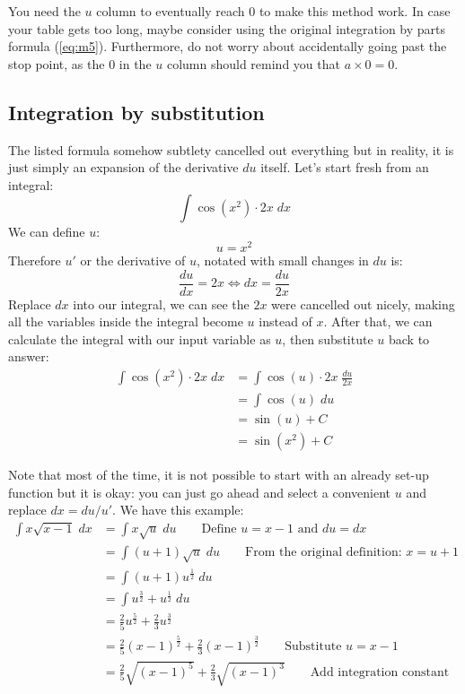 You need the $u$ column to eventually reach $0$ to make this method work. In case your table gets too long, maybe consider using the original integration by parts formula (\ref{eq:m5}). Furthermore, do not worry about accidentally going past the stop point, as the $0$ in the $u$ column should remind you that $a\times0=0$.

\subsection{Integration by substitution}
The listed formula somehow subtlety cancelled out everything but in reality, it is just simply an expansion of the derivative $du$ itself. Let's start fresh from an integral:
\[
    \int \cos(x^2) \cdot 2x \;dx
\]
We can define $u$:
\[
    u = x^2
\]
Therefore $u'$ or the derivative of $u$, notated with small changes in $du$ is:
\[
    \frac{du}{dx} = 2x
    \Leftrightarrow
    dx=\frac{du}{2x}
\]
Replace $dx$ into our integral, we can see the $2x$ were cancelled out nicely, making all the variables inside the integral become $u$ instead of $x$. After that, we can calculate the integral with our input variable as $u$, then substitute $u$ back to answer:
\[\begin{aligned}
    \int \cos(x^2) \cdot 2x \;dx
    &= \int \cos(u) \cdot 2x \;\frac{du}{2x} \\
    &= \int \cos(u) \;du \\
    &= \sin(u) + C \\
    &= \sin(x^2) + C
\end{aligned}\]

Note that most of the time, it is not possible to start with an already set-up function but it is okay: you can just go ahead and select a convenient $u$ and replace $dx=du/u'$. We have this example:
\[\begin{aligned}
    \int x\sqrt{x-1} \;dx
    &= \int x\sqrt{u} \;du
    \qquad\text{Define } u=x-1 \text{ and } du=dx \\
    &= \int (u+1)\sqrt{u} \;du
    \qquad\text{From the original definition: } x=u+1 \\
    &= \int (u+1)u^{\frac{1}{2}} \;du \\
    &= \int u^{\frac{3}{2}} + u^{\frac{1}{2}} \;du \\
    &= \frac{2}{5}u^{\frac{5}{2}} + \frac{2}{3}u^{\frac{3}{2}} \\
    &= \frac{2}{5}(x-1)^{\frac{5}{2}} + \frac{2}{3}(x-1)^{\frac{3}{2}}
    \qquad\text{Substitute } u=x-1 \\
    &= \frac{2}{5}\sqrt{(x-1)^5} + \frac{2}{3}\sqrt{(x-1)^3}
    \qquad\text{Add integration constant}
\end{aligned}\]

